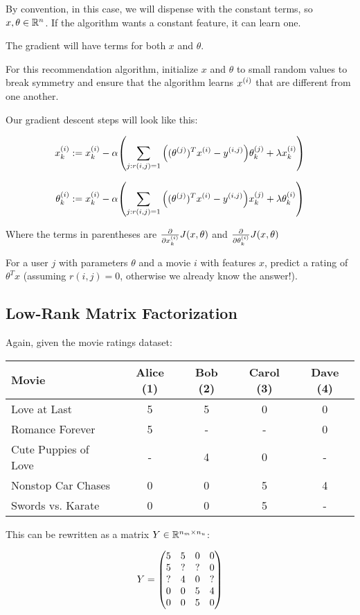 By convention, in this case, we will dispense with the constant terms, so $x,\theta \in \mathbb{R}^n$.
If the algorithm wants a constant feature, it can learn one.

The gradient will have terms for both $x$ and $\theta$.

For this recommendation algorithm, initialize $x$ and $\theta$ to small random values
to break symmetry and ensure that the algorithm learns $x_{}^{(i)}$ that are different from one another.

Our gradient descent steps will look like this:

\[
    x_{k}^{(i)} := x_{k}^{(i)} - \alpha \qty(
        \sum_{j:r(i,j)=1} \qty((\theta_{}^{(j)})^T x_{}^{(i)} - y_{}^{(i,j)}) \theta_{k}^{(j)} 
        + \lambda x_{k}^{(i)}
    )
\]

\[
    \theta_{k}^{(i)} := x_{k}^{(i)} - \alpha \qty(
        \sum_{j:r(i,j)=1} \qty((\theta_{}^{(j)})^T x_{}^{(i)} - y_{}^{(i,j)}) x_{k}^{(j)} 
        + \lambda \theta_{k}^{(i)}
    )
\]

Where the terms in parentheses are $\pdv{x_{k}^{(i)}} J(x,\theta)$ and $\pdv{\theta_{k}^{(i)}} J(x,\theta)$

For a user $j$ with parameters $\theta$ and a movie $i$ with features $x$, predict a rating of $\theta^T x$
(assuming $r(i,j)=0$, otherwise we already know the answer!).

\subsection{Low-Rank Matrix Factorization}

Again, given the movie ratings dataset:

\begin{center}
\begin{tabular}{l|cccc}
    Movie                & Alice (1) & Bob (2) & Carol (3) & Dave (4) \\ \hline
    Love at Last         & 5 & 5 & 0 & 0 \\
    Romance Forever      & 5 & - & - & 0 \\
    Cute Puppies of Love & - & 4 & 0 & - \\
    Nonstop Car Chases   & 0 & 0 & 5 & 4 \\
    Swords vs. Karate    & 0 & 0 & 5 & -
\end{tabular}
\end{center}

This can be rewritten as a matrix $Y \in \mathbb{R}^{n_m \times n_u}$:

\[
    Y = \mqty(
        5 & 5 & 0 & 0 \\
        5 & ? & ? & 0 \\
        ? & 4 & 0 & ? \\
        0 & 0 & 5 & 4 \\
        0 & 0 & 5 & 0
    )
\]

